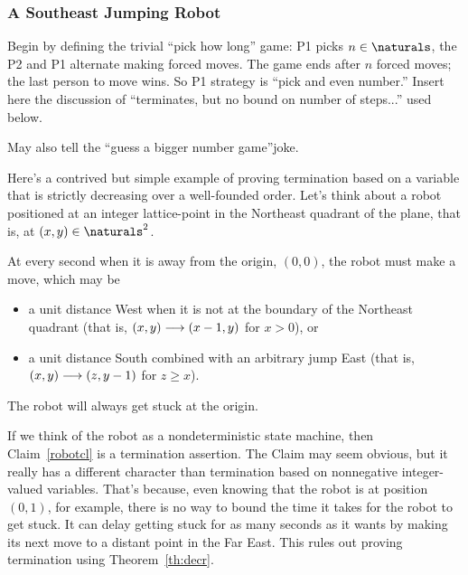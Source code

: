 \begin{editingnotes}
\subsubsection{A Southeast Jumping Robot}

\begin{staffnotes}Begin by defining the trivial ``pick how long'' game: P1 picks $n
\in \naturals$, the P2 and P1 alternate making forced moves.  The game
ends after $n$ forced moves; the last person to move wins.  So P1 strategy
is ``pick and even number.''  Insert here the discussion of ``terminates,
but no bound on number of steps...'' used below.

May also tell the ``guess a bigger number game''joke.
\end{staffnotes}

Here's a contrived but simple example of proving termination based on a
variable that is strictly decreasing over a well-founded order.  Let's
think about a robot positioned at an integer lattice-point in the
Northeast quadrant of the plane, that is, at $(x,y) \in \naturals^2$.

At every second when it is away from the origin, $(0,0)$, the robot must
make a move, which may be
\begin{itemize}

\item a unit distance West when it is not at the boundary of the Northeast
  quadrant (that is, $(x,y) \mathrel{\longrightarrow} (x-1,y)$ for $x>0$), or

\item a unit distance South combined with an arbitrary jump East (that is,
     $(x,y) \mathrel{\longrightarrow} (z,y-1)$ for $z\geq x$).

\end{itemize}
\begin{claim}\label{robotcl}
The robot will always get stuck at the origin.
\end{claim}

If we think of the robot as a nondeterministic state machine, then
Claim~\ref{robotcl} is a termination assertion.  The Claim may seem
obvious, but it really has a different character than termination based on
nonnegative integer-valued variables.  That's because, even knowing that
the robot is at position $(0,1)$, for example, there is no way to bound
the time it takes for the robot to get stuck.  It can delay getting stuck
for as many seconds as it wants by making its next move to a distant point
in the Far East.  This rules out proving termination using
Theorem~\ref{th:decr}.


\end{editingnotes}
